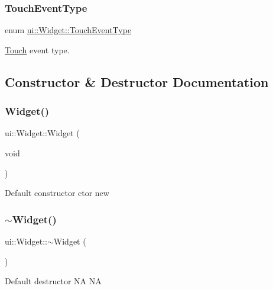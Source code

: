 \subsubsection{\texorpdfstring{Touch\+Event\+Type}{TouchEventType}\hspace{0.1cm}{\footnotesize\ttfamily [2/2]}}
{\footnotesize\ttfamily enum \hyperlink{classui_1_1Widget_a4829c0f1cbaf1fd820a9b2ccf0c58c73}{ui\+::\+Widget\+::\+Touch\+Event\+Type}\hspace{0.3cm}{\ttfamily [strong]}}

\hyperlink{classTouch}{Touch} event type. 

\subsection{Constructor \& Destructor Documentation}
\mbox{\label{classui_1_1Widget_a57287568cdb4b8e94303535c2d9cf892}} 
\subsubsection{\texorpdfstring{Widget()}{Widget()}\hspace{0.1cm}{\footnotesize\ttfamily [1/2]}}
{\footnotesize\ttfamily ui\+::\+Widget\+::\+Widget (\begin{DoxyParamCaption}\item[{void}]{ }\end{DoxyParamCaption})}

Default constructor  ctor  new \mbox{\label{classui_1_1Widget_a3c336c3bbb6d172611851179073ecacc}} 
\subsubsection{\texorpdfstring{$\sim$\+Widget()}{~Widget()}\hspace{0.1cm}{\footnotesize\ttfamily [1/2]}}
{\footnotesize\ttfamily ui\+::\+Widget\+::$\sim$\+Widget (\begin{DoxyParamCaption}{ }\end{DoxyParamCaption})\hspace{0.3cm}{\ttfamily [virtual]}}

Default destructor  NA  NA \mbox{\label{classui_1_1Widget_a57287568cdb4b8e94303535c2d9cf892}} 
